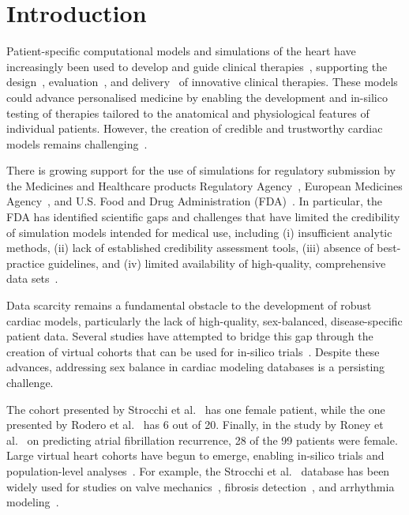 \section{Introduction}
Patient-specific computational models and simulations of the heart have increasingly  
been used to develop and guide clinical therapies~\cite{solis-lemus2023_reproducibility},
supporting the  
design~\cite{gray-2018-models_design,vanderlaan-2024-models_design}, 
evaluation~\cite{niederer-2019-models_evaluation,sung-2024-models_evaluation}, 
and delivery~\cite{lee-2018-models_delivery,dokuchaev-2023-models_delivery}
of innovative clinical therapies.
These models could advance personalised medicine by enabling the development and 
in-silico testing of therapies tailored to the anatomical and physiological features of individual patients.
However, the creation of credible and trustworthy cardiac models remains 
challenging~\cite{pras2018-intro-regulatory,jaffery-2024-review}.

There is growing support for the use of simulations for regulatory submission by the 
Medicines and Healthcare products Regulatory Agency~\cite{shepard-2015-mhra}, 
European Medicines Agency~\cite{ema2025_web}, and 
U.S. Food and Drug Administration (FDA)~\cite{jaffery-2024-review,fda2023_web}.
In particular, the FDA has identified scientific gaps and challenges that have limited 
the credibility of simulation models intended for medical use, including
(i) insufficient analytic methods, 
(ii) lack of established credibility assessment tools, 
(iii) absence of best-practice guidelines, and 
(iv) limited availability of high-quality, comprehensive data sets~\cite{fda2023_web}.

Data scarcity remains a fundamental obstacle to the development of robust cardiac models,
particularly the lack of high-quality, sex-balanced, disease-specific patient data. 
Several studies have attempted to bridge this gap through the creation of virtual cohorts that can 
be used for in-silico trials~\cite{strocchi2020_cohort,rodero2021_linking}.
Despite these advances, addressing sex balance in cardiac modeling databases is a persisting challenge. 

The cohort presented by Strocchi et al.~\cite{strocchi2020_cohort} has one 
female patient, while the one presented by Rodero et al.~\cite{rodero2021_linking} 
has 6 out of 20. Finally, in the study by Roney et al.~\cite{Roney2022-predicting} 
on predicting atrial fibrillation recurrence, 28 of the 99 patients were female.
Large virtual heart cohorts have begun to emerge, enabling in-silico trials and population-level 
analyses~\cite{passini2021_virtual,rodero-2021-virtualcohort1000,rodero-2021-virtualcohortextreme}. 
For example, the Strocchi et al.~\cite{strocchi2020_cohort} database has been 
widely used for studies on valve mechanics~\cite{feng2024_db_user}, 
fibrosis detection~\cite{okenov2024_db_user}, and 
arrhythmia modeling~\cite{kaboudian2023_db_user}.

